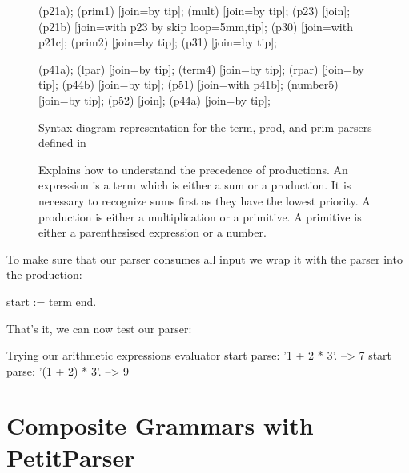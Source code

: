 \documentclass[a4paper,10pt,twoside]{book}
\begin{document}
\begin{figure}
{{    \chainin (p21a);
    \chainin (prim1) [join=by tip];
    \chainin (mult) [join=by tip];
    \chainin (p23)    [join];
    \chainin (p21b)    [join=with p23 by {skip loop=5mm,tip}];
    \chainin (p30)    [join=with p21c];
    \chainin (prim2)    [join=by tip];
    \chainin (p31)    [join=by tip];

    \chainin (p41a);
    \chainin (lpar) [join=by tip];
    \chainin (term4) [join=by tip];
    \chainin (rpar) [join=by tip];
    \chainin (p44b)    [join=by tip];
    \chainin (p51) [join=with p41b];
    \chainin (number5) [join=by tip];
    \chainin (p52) [join];
    \chainin (p44a) [join=by tip];
  }
}
  \caption{Syntax diagram representation for the term, prod, and prim parsers defined in }
  \label{fig:syntax-arithmetic}
\end{figure}

\begin{figure}
  \centering

  \caption{Explains how to understand the precedence of productions. An expression is a term which is  either a sum or a production. It is necessary to recognize sums first as they have the lowest priority. A production is either a multiplication or a primitive. A primitive is either a parenthesised expression or a number.}
  \label{fig:expression-precedence}
\end{figure}

To make sure that our parser consumes all input we wrap it with the
 parser into the  production:

\begin{code}{}
start := term end.
\end{code}

That's it, we can now test our parser:

\begin{script}{Trying our arithmetic expressions evaluator}
start parse: '1 + 2 * 3'.       --> 7
start parse: '(1 + 2) * 3'.     --> 9
\end{script}

\section{Composite Grammars with PetitParser}
\end{document}
